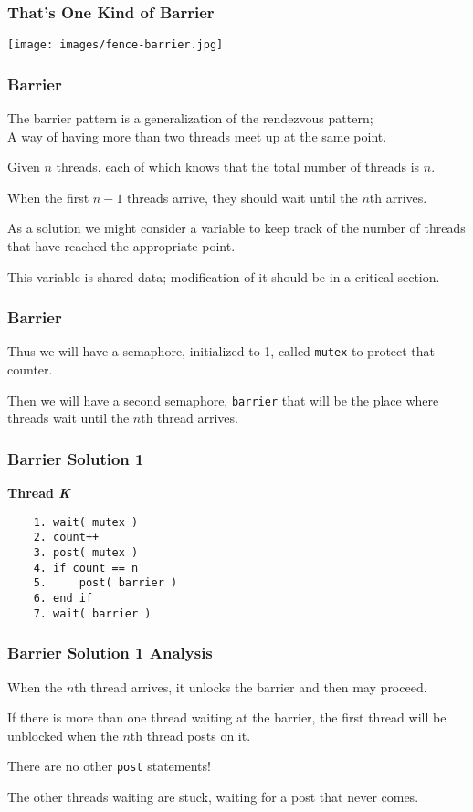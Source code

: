 \begin{frame}
	\frametitle{That's One Kind of Barrier}

	\begin{center}
		\texttt{[image: images/fence-barrier.jpg]}
	\end{center}

\end{frame}


\begin{frame}
	\frametitle{Barrier}

	The barrier pattern is a generalization of the rendezvous pattern;\\
	\quad A way of having more than two threads meet up at the same point.

	Given $n$ threads, each of which knows that the total number of threads is $n$.

	When the first $n-1$ threads arrive, they should wait until the $n$th arrives.

	As a solution we might consider a variable to keep track of the number of threads that have reached the appropriate point.

	This variable is shared data; modification of it should be in a critical section.


\end{frame}

\begin{frame}
	\frametitle{Barrier}

	Thus we will have a semaphore, initialized to 1, called \texttt{mutex} to protect that counter.

	Then we will have a second semaphore, \texttt{barrier} that will be the place where threads wait until the $n$th thread arrives.


\end{frame}

\begin{frame}[fragile]
	\frametitle{Barrier Solution 1}

	\textbf{Thread \textit{K}}\vspace{-10em}
	\begin{verbatim}
	1. wait( mutex )
	2. count++
	3. post( mutex )
	4. if count == n
	5.     post( barrier )
	6. end if
	7. wait( barrier )
  \end{verbatim}
	\vspace{-2em}


\end{frame}

\begin{frame}
	\frametitle{Barrier Solution 1 Analysis}

	When the $n$th thread arrives, it unlocks the barrier and then may proceed.

	If there is more than one thread waiting at the barrier, the first thread will be unblocked when the $n$th thread posts on it.

	There are no other \texttt{post} statements!

	The other threads waiting are stuck, waiting for a post that never comes.


\end{frame}


